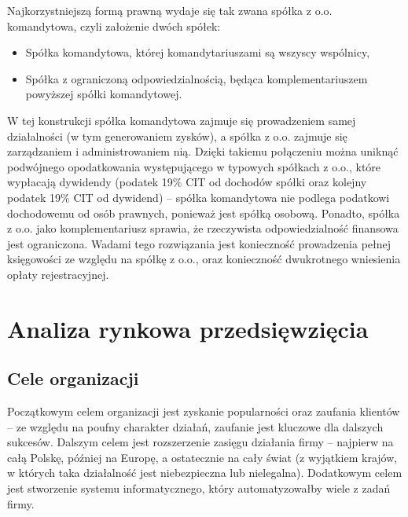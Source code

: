 \documentclass{article}
\begin{document}
Najkorzystniejszą formą prawną wydaje się tak zwana spółka z o.o. komandytowa, czyli założenie dwóch spółek:
\begin{itemize}
\item Spółka komandytowa, której komandytariuszami są wszyscy wspólnicy,
\item Spółka z ograniczoną odpowiedzialnością, będąca komplementariuszem powyższej spółki komandytowej.
\end{itemize}
W tej konstrukcji spółka komandytowa zajmuje się prowadzeniem samej działalności (w tym generowaniem zysków), a spółka z o.o. zajmuje się zarządzaniem i administrowaniem nią. Dzięki takiemu połączeniu można uniknąć podwójnego opodatkowania występującego w typowych spółkach z o.o., które wypłacają dywidendy (podatek 19\% CIT od dochodów spółki oraz kolejny podatek 19\% CIT od dywidend) -- spółka komandytowa nie podlega podatkowi dochodowemu od osób prawnych, ponieważ jest spółką osobową. Ponadto, spółka z o.o. jako komplementariusz sprawia, że rzeczywista odpowiedzialność finansowa jest ograniczona. Wadami tego rozwiązania jest konieczność prowadzenia pełnej księgowości ze względu na spółkę z o.o., oraz konieczność dwukrotnego wniesienia opłaty rejestracyjnej.


\section{Analiza rynkowa przedsięwzięcia}
\subsection{Cele organizacji}
Początkowym celem organizacji jest zyskanie popularności oraz zaufania klientów -- ze względu na poufny charakter działań, zaufanie jest kluczowe dla dalszych sukcesów. Dalszym celem jest rozszerzenie zasięgu działania firmy -- najpierw na całą Polskę, później na Europę, a ostatecznie na cały świat (z wyjątkiem krajów, w których taka działalność jest niebezpieczna lub nielegalna). Dodatkowym celem jest stworzenie systemu informatycznego, który automatyzowałby wiele z zadań firmy.
\end{document}
